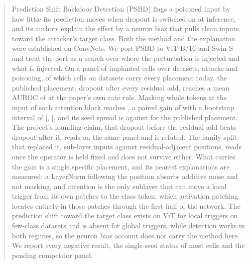 \documentclass[../main.tex]{subfiles}
\begin{document}
\begin{abstract}
Prediction Shift Backdoor Detection (PSBD) flags a poisoned input by how little its prediction moves when dropout is switched on at inference, and its authors explain the effect by a neuron bias that pulls clean inputs toward the attacker's target class. Both the method and the explanation were established on ConvNets. We port PSBD to ViT-B/16 and Swin-S and treat the port as a search over where the perturbation is injected and what is injected. On a panel of \PanelCellsClearing{} implanted cells over \PanelDatasetsDeclared{} datasets, \PanelAttacksDeclared{} attacks and \PanelRates{} poisoning, of which \PanelCellsCached{} cells on \PanelDatasetsCached{} datasets carry every placement today, the published placement, dropout after every residual add, reaches a mean AUROC of \PublishedAurocAdaptive{} at the paper's own rate rule. Masking whole tokens at the input of each attention block reaches \HeadlineAurocAdaptive{}, a paired gain of \HeadlineGainAdaptiveAuroc{} with a bootstrap interval of [\HeadlineGainAdaptiveAurocLow{}, \HeadlineGainAdaptiveAurocHigh{}], and its seed spread is \SeedSdRecommended{} against \SeedSdPublished{} for the published placement. The project's founding claim, that dropout before the residual add beats dropout after it, reads \PreMinusPostMatched{} on the same panel and is refuted. The family split that replaced it, sub-layer inputs against residual-adjacent positions, reads \FamilyGapMatched{} once the operator is held fixed and does not survive either. What carries the gain is a single specific placement, and its nearest explanations are measured: a LayerNorm following the position absorbs additive noise and not masking, and attention is the only sublayer that can move a local trigger from its own patches to the class token, which activation patching locates entirely in those patches through the first half of the network. The prediction shift toward the target class exists on ViT for local triggers on few-class datasets and is absent for global triggers, while detection works in both regimes, so the neuron bias account does not carry the method here. We report every negative result, the single-seed status of most cells and the pending competitor panel.
\end{abstract}
\end{document}
